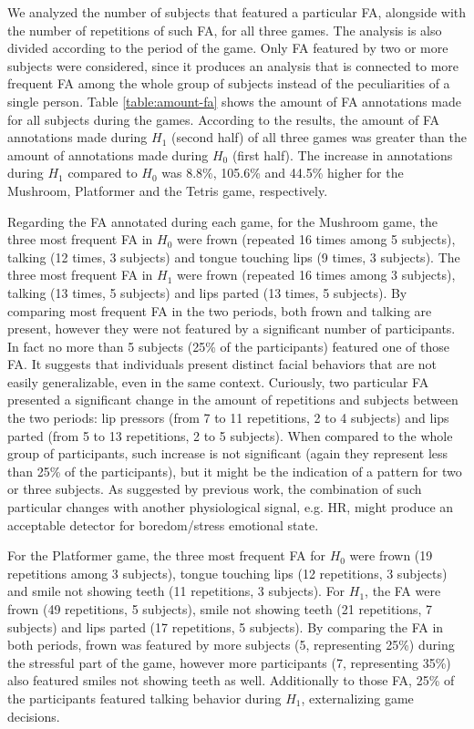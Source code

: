 We analyzed the number of subjects that featured a particular FA, alongside with the number of repetitions of such FA, for all three games. The analysis is also divided according to the period of the game. Only FA featured by two or more subjects were considered, since it produces an analysis that is connected to more frequent FA among the whole group of subjects instead of the peculiarities of a single person. Table \ref{table:amount-fa} shows the amount of FA annotations made for all subjects during the games. According to the results, the amount of FA annotations made during $H_1$ (second half) of all three games was greater than the amount of annotations made during $H_0$ (first half). The increase in annotations during $H_1$ compared to $H_0$ was 8.8\%, 105.6\% and 44.5\% higher for the Mushroom, Platformer and the Tetris game, respectively.

Regarding the FA annotated during each game, for the Mushroom game, the three most frequent FA in $H_0$ were frown (repeated 16 times among 5 subjects), talking (12 times, 3 subjects) and tongue touching lips (9 times, 3 subjects). The three most frequent FA in $H_1$ were frown (repeated 16 times among 3 subjects), talking (13 times, 5 subjects) and lips parted (13 times, 5 subjects). By comparing most frequent FA in the two periods, both frown and talking are present, however they were not featured by a significant number of participants. In fact no more than 5 subjects (25\% of the participants) featured one of those FA. It suggests that individuals present distinct facial behaviors that are not easily generalizable, even in the same context. Curiously, two particular FA presented a significant change in the amount of repetitions and subjects between the two periods: lip pressors (from 7 to 11 repetitions, 2 to 4 subjects) and lips parted (from 5 to 13 repetitions, 2 to 5 subjects). When compared to the whole group of participants, such increase is not significant (again they represent less than 25\% of the participants), but it might be the indication of a pattern for two or three subjects. As suggested by previous work, the combination of such particular changes with another physiological signal, e.g. HR, might produce an acceptable detector for boredom/stress emotional state.

For the Platformer game, the three most frequent FA for $H_0$ were frown (19 repetitions among 3 subjects), tongue touching lips (12 repetitions, 3 subjects) and smile not showing teeth (11 repetitions, 3 subjects). For $H_1$, the FA were frown (49 repetitions, 5 subjects), smile not showing teeth (21 repetitions, 7 subjects) and lips parted (17 repetitions, 5 subjects). By comparing the FA in both periods, frown was featured by more subjects (5, representing 25\%) during the stressful part of the game, however more participants (7, representing 35\%) also featured smiles not showing teeth as well. Additionally to those FA, 25\% of the participants featured talking behavior during $H_1$, externalizing game decisions.

